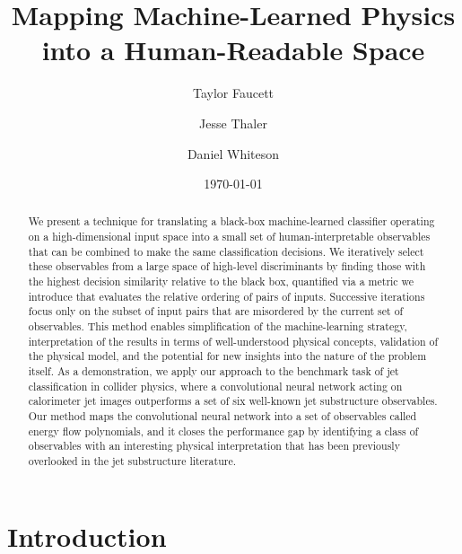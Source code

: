 \documentclass[aps,prd,twocolumn,superscriptaddress,preprintnumbers,nofootinbib,longbibliography,floatfix]{revtex4-1}
\begin{document}

\title{Mapping Machine-Learned Physics into a Human-Readable Space}

\begin{abstract}
	We present a technique for translating a black-box machine-learned classifier operating on a high-dimensional input space into a small set of human-interpretable observables that can be combined to make the same classification decisions. We iteratively select these observables from a large space of high-level discriminants by finding those with the highest decision similarity relative to the black box, quantified via a metric we introduce that evaluates the relative ordering of pairs of inputs. Successive iterations focus only on the subset of input pairs that are misordered by the current set of observables. This method enables simplification of the machine-learning strategy, interpretation of the results in terms of well-understood physical concepts, validation of the physical model, and the potential for new insights into the nature of the problem itself. As a demonstration, we apply our approach to the benchmark task of jet classification in collider physics, where a convolutional neural network acting on calorimeter jet images outperforms a set of six well-known jet substructure observables. Our method maps the convolutional neural network into a set of observables called energy flow polynomials, and it closes the performance gap by identifying a class of observables with an interesting physical interpretation that has been previously overlooked in the jet substructure literature.
\end{abstract}

\author{Taylor Faucett}
\author{Jesse Thaler}
\author{Daniel Whiteson}
\date{\today}
\maketitle

{
\small
\tableofcontents
}

\section{Introduction}
\label{sec:intro}
\end{document}
